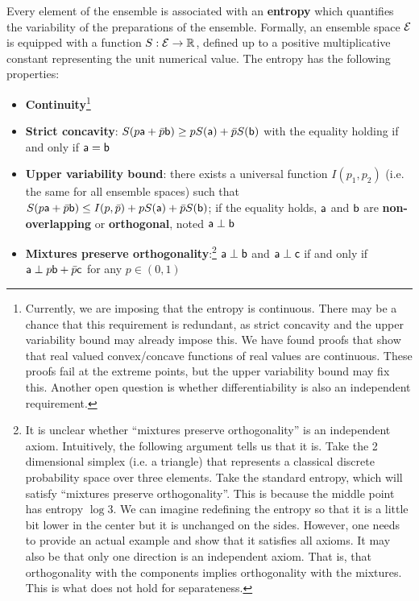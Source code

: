 \begin{mathSection}
\begin{axiom}
	Every element of the ensemble is associated with an \textbf{entropy} which quantifies the variability of the preparations of the ensemble. Formally, an ensemble space $\Ens$ is equipped with a function $S : \Ens \to \mathbb{R}$, defined up to a positive multiplicative constant representing the unit numerical value. The entropy has the following properties:
	\begin{itemize}
		\item \textbf{Continuity}\footnote{Currently, we are imposing that the entropy is continuous. There may be a chance that this requirement is redundant, as strict concavity and the upper variability bound may already impose this. We have found proofs that show that real valued convex/concave functions of real values are continuous. These proofs fail at the extreme points, but the upper variability bound may fix this. Another open question is whether differentiability is also an independent requirement.}
		\item \textbf{Strict concavity}: $S(p\ens[a] + \bar{p} \ens[b]) \geq p S(\ens[a]) + \bar{p} S(\ens[b])$ with the equality holding if and only if $\ens[a] = \ens[b]$
		\item \textbf{Upper variability bound}: there exists a universal function $I(p_1, p_2)$ (i.e. the same for all ensemble spaces) such that $S(p\ens[a] + \bar{p} \ens[b]) \leq I(p, \bar{p}) + p S(\ens[a]) + \bar{p} S(\ens[b])$; if the equality holds, $\ens[a]$ and $\ens[b]$ are \textbf{non-overlapping} or \textbf{orthogonal}, noted $\ens[a] \ortho \ens[b]$
		\item \textbf{Mixtures preserve orthogonality}:\footnote{It is unclear whether ``mixtures preserve orthogonality'' is an independent axiom. Intuitively, the following argument tells us that it is. Take the 2 dimensional simplex (i.e. a triangle) that represents a classical discrete probability space over three elements. Take the standard entropy, which will satisfy ``mixtures preserve orthogonality''. This is because the middle point has entropy $\log 3$. We can imagine redefining the entropy so that it is a little bit lower in the center but it is unchanged on the sides. However, one needs to provide an actual example and show that it satisfies all axioms. It may also be that only one direction is an independent axiom. That is, that orthogonality with the components implies orthogonality with the mixtures. This is what does not hold for separateness.} $\ens[a] \ortho \ens[b]$ and $\ens[a] \ortho \ens[c]$ if and only if $\ens[a] \ortho p \ens[b] + \bar{p} \ens[c]$ for any $p \in (0,1)$
	\end{itemize}
\end{axiom}


\end{mathSection}
